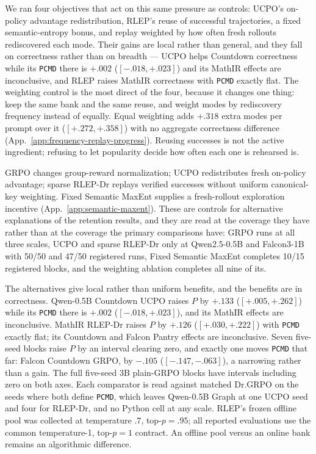 \documentclass{article}
\newcommand{\1}{\mathbf 1}
\newcommand{\pmd}{\texttt{PCMD}}
\theoremstyle{remark}
\theoremstyle{definition}
\theoremstyle{plain}
\begin{document}
We ran four objectives that act on this same pressure as controls: UCPO's
on-policy advantage redistribution, RLEP's reuse of successful trajectories, a
fixed semantic-entropy bonus, and replay weighted by how often fresh rollouts
rediscovered each mode. Their gains are local rather than general, and they fall on
correctness rather than on breadth --- UCPO helps Countdown correctness while
its \pmd{} there is $+.002$ ($[-.018,+.023]$) and its MathIR effects are
inconclusive, and RLEP raises MathIR correctness with \pmd{} exactly flat. The weighting control is the most direct of the four, because it
changes one thing: keep the same bank and the same reuse, and weight modes by
rediscovery frequency instead of equally. Equal weighting adds $+.318$ extra
modes per prompt over it ($[+.272,+.358]$) with no aggregate correctness
difference (App.~\ref{app:frequency-replay-progress}). Reusing successes is not
the active ingredient; refusing to let popularity decide how often each one is
rehearsed is.

GRPO changes group-reward normalization; UCPO redistributes fresh on-policy
advantage; sparse RLEP-Dr replays verified successes without uniform
canonical-key weighting. Fixed Semantic MaxEnt supplies a fresh-rollout
exploration incentive (App.~\ref{app:semantic-maxent}). These are
controls for alternative explanations of the retention results, and they
are read at the coverage they have rather than at the coverage the primary
comparisons have: GRPO runs at all three scales, UCPO and sparse RLEP-Dr
only at Qwen2.5-0.5B and Falcon3-1B with 50/50 and 47/50 registered runs,
Fixed Semantic MaxEnt completes 10/15 registered blocks, and the weighting
ablation completes all nine of its.


The alternatives give local rather than uniform benefits, and the
benefits are in correctness. Qwen-0.5B Countdown UCPO raises $P$ by $+.133$
($[+.005,+.262]$) while its \pmd{} there is $+.002$ ($[-.018,+.023]$), and its
MathIR effects are inconclusive. MathIR RLEP-Dr raises $P$ by $+.126$
($[+.030,+.222]$) with \pmd{} exactly flat; its Countdown and Falcon Pantry
effects are inconclusive. Seven five-seed blocks raise $P$ by an interval
clearing zero, and exactly one moves \pmd{} that far: Falcon Countdown GRPO,
by $-.105$ ($[-.147,-.063]$), a narrowing rather than a gain. The full
five-seed 3B plain-GRPO blocks have intervals including zero on both axes.
Each comparator is read against matched Dr.GRPO on the seeds where both define
\pmd{}, which leaves Qwen-0.5B Graph at one UCPO seed and four for RLEP-Dr,
and no Python cell at any scale.
RLEP's frozen offline pool was collected at temperature $.7$, top-$p=.95$;
all reported evaluations use the common temperature-1, top-$p=1$ contract.
An offline pool versus an online bank remains an algorithmic difference.
\end{document}
